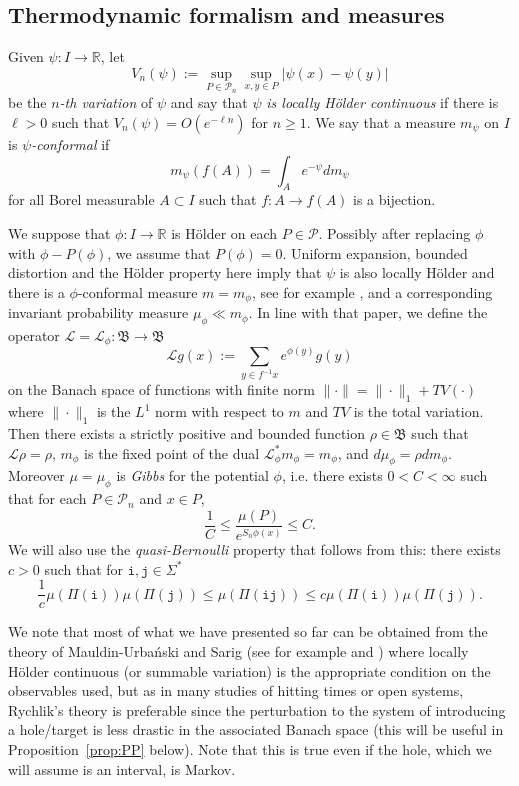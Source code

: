 \documentclass[11pt, reqno]{amsart}
\numberwithin{equation}{section}
\theoremstyle{plain}%
\theoremstyle{definition}
\def\R{\ensuremath{\mathbb R}}
\def\L{\ensuremath{\mathcal L}}
\def\P{\ensuremath{\mathcal P}}
\renewcommand{\i}{\mathtt{i}}
\renewcommand{\j}{\mathtt{j}}
\theoremstyle{nonumberplain}
\begin{document}
\subsection{Thermodynamic formalism and measures}

 Given $\psi:I\to \R$, let  $$V_n(\psi):= \sup_{P\in \P_n}\sup_{x, y\in P}|\psi(x)-\psi(y)|$$ be the \emph{$n$-th variation} of $\psi$ and say that $\psi$ \emph{is locally H\"older continuous} if there is $\ell>0$ such that $ V_n(\psi)= O(e^{-\ell n})$ for $n\ge 1$.  We say that a measure $m_\psi$ on $I$ is \emph{$\psi$-conformal} if
$$m_\psi(f(A))=\int_A e^{-\psi} dm_\psi$$
for all Borel measurable $A \subset I$ such that $f:A \to f(A)$ is a bijection.

We suppose that $\phi:I\to \R$ is H\"older on each $P\in \P$.  Possibly after replacing $\phi$ with $\phi-P(\phi)$, we assume that $P(\phi)=0$.  Uniform expansion, bounded distortion and the H\"older property here imply that $\psi$ is also locally H\"older and there is a $\phi$-conformal measure $m=m_\phi$, see for example \cite{Ryc83}, and a corresponding invariant probability measure $\mu_\phi \ll m_\phi$.  In line with that paper, we define the operator $\L= \L_\phi: \mathfrak{B} \to \mathfrak{B}$
$$\L g(x):=\sum_{y \in f^{-1}x} e^{\phi(y)} g(y)$$
on the Banach space of functions with finite norm $\|\cdot\|=\|\cdot\|_{1}+TV(\cdot)$ where $\|\cdot\|_1$ is the $L^1$ norm with respect to $m$ and $TV$ is the total variation.  Then there exists a strictly positive and bounded function $\rho \in \mathfrak{B}$ such that $\L \rho=\rho$, $m_\phi$ is  the fixed point of the dual $\L_\phi^*m_\phi=m_\phi$, and $d\mu_\phi=\rho dm_\phi$. Moreover $\mu=\mu_\phi$ is \emph{Gibbs} for the potential $\phi$, i.e. there exists $0<C<\infty$ such that for each $P \in \P_n$ and $x\in P$,
$$\frac{1}{C} \leq \frac{\mu(P)}{e^{S_n \phi(x)}} \leq C.$$
We will also use the  \emph{quasi-Bernoulli} property that follows from this: there exists $c>0$ such that for $\i, \j\in \Sigma^*$
$$\frac{1}{c}\mu(\Pi(\i)) \mu(\Pi(\j)) \leq\mu(\Pi(\i \j)) \le c\mu(\Pi(\i)) \mu(\Pi(\j)).$$


We note that most of what we have presented so far can be obtained from the theory of Mauldin-Urba\'nski and Sarig (see for example \cite{MauUrb01} and \cite{Sar99}) where locally H\"older continuous (or summable variation) is the appropriate condition on the observables used, but as in many studies of hitting times or open systems, Rychlik's theory is preferable since the perturbation to the system of introducing a hole/target is less drastic in the associated Banach space (this will be useful in Proposition~\ref{prop:PP} below).  Note that this is true even if the hole, which we will assume is an interval, is Markov.
\end{document}
